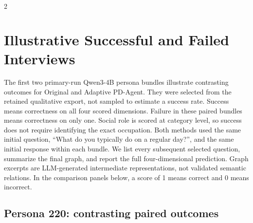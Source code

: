 \documentclass{ieeeaccess}
\begin{document}
\begin{multicols*}{2}
\raggedcolumns
\section{Illustrative Successful and Failed Interviews}
\label{app:qualitative-interviews}
The first two primary-run Qwen3-4B persona bundles illustrate contrasting outcomes for
Original and Adaptive PD-Agent. They were selected from the retained qualitative export,
not sampled to estimate a success rate. Success means correctness on all four scored
dimensions. Failure in these paired bundles means correctness on only one. Social role is scored at category
level, so success does not require identifying the exact occupation. Both methods used the
same initial question, ``What do you typically do on a regular day?'', and the same initial
response within each bundle. We list every subsequent selected question, summarize the
final graph, and report the full four-dimensional prediction. Graph excerpts are
LLM-generated intermediate representations, not validated semantic relations.
In the comparison panels below, a score of 1 means correct and 0 means incorrect.

\subsection{Persona 220: contrasting paired outcomes}


\end{multicols*}
\end{document}
